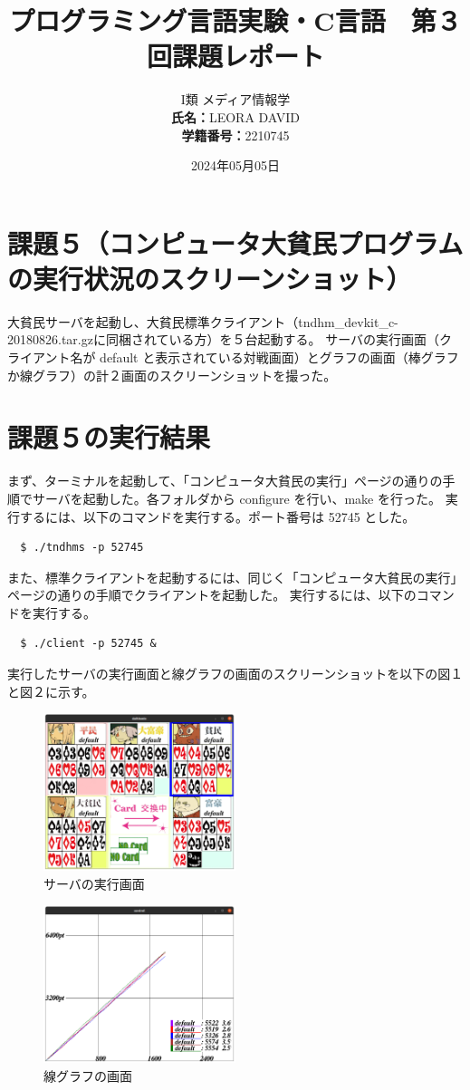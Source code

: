 \documentclass[]{jsarticle}
\title{\vspace{-3cm} プログラミング言語実験・C言語　第３回課題レポート}
\author{I類 メディア情報学 \\\textbf{氏名：}LEORA DAVID\\\textbf{学籍番号：}2210745}
\date{2024年05月05日}
\begin{document}
\maketitle

\section*{課題５（コンピュータ大貧民プログラムの実行状況のスクリーンショット）}
大貧民サーバを起動し、大貧民標準クライアント（tndhm\_devkit\_c-20180826.tar.gzに同梱されている方）を５台起動する。
サーバの実行画面（クライアント名が default と表示されている対戦画面）とグラフの画面（棒グラフか線グラフ）の計２画面のスクリーンショットを撮った。\\

\section*{課題５の実行結果}
まず、ターミナルを起動して、「コンピュータ大貧民の実行」ページの通りの手順でサーバを起動した。各フォルダから configure を行い、make を行った。
実行するには、以下のコマンドを実行する。ポート番号は 52745 とした。
\begin{lstlisting}
  $ ./tndhms -p 52745
\end{lstlisting}

また、標準クライアントを起動するには、同じく「コンピュータ大貧民の実行」ページの通りの手順でクライアントを起動した。
実行するには、以下のコマンドを実行する。
\begin{lstlisting}
  $ ./client -p 52745 &
\end{lstlisting}

実行したサーバの実行画面と線グラフの画面のスクリーンショットを以下の図１と図２に示す。
\begin{figure}[h]
  \centering
  \includegraphics[width=0.5\textwidth]{kadai5/1.png}
  \caption{サーバの実行画面}
\end{figure}

\begin{figure}[h]
  \centering
  \includegraphics[width=0.5\textwidth]{kadai5/2.png}
  \caption{線グラフの画面}
\end{figure}
\end{document}
